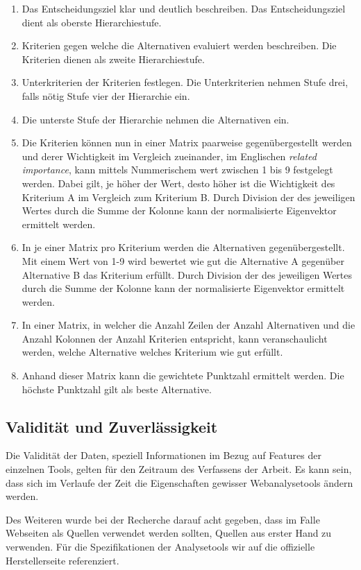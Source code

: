 \begin{enumerate}
  \item Das Entscheidungsziel klar und deutlich beschreiben. Das Entscheidungsziel dient als oberste Hierarchiestufe.
  \item Kriterien gegen welche die Alternativen evaluiert werden beschreiben. Die Kriterien dienen als zweite Hierarchiestufe.
  \item Unterkriterien der Kriterien festlegen. Die Unterkriterien nehmen Stufe drei, falls nötig Stufe vier der Hierarchie ein.
  \item Die unterste Stufe der Hierarchie nehmen die Alternativen ein.
  \item Die Kriterien können nun in einer Matrix paarweise gegenübergestellt werden und derer Wichtigkeit im Vergleich zueinander, im Englischen \textit{related importance}, kann mittels Nummerischem wert zwischen 1 bis 9 festgelegt werden. Dabei gilt, je höher der Wert, desto höher ist die Wichtigkeit des Kriterium A im Vergleich zum Kriterium B. Durch Division der des jeweiligen Wertes durch die Summe der Kolonne kann der normalisierte Eigenvektor ermittelt werden.
  \item In je einer Matrix pro Kriterium werden die Alternativen gegenübergestellt. Mit einem Wert von 1-9 wird bewertet wie gut die Alternative A gegenüber Alternative B das Kriterium erfüllt. Durch Division der des jeweiligen Wertes durch die Summe der Kolonne kann der normalisierte Eigenvektor ermittelt werden.
  \item In einer Matrix, in welcher die Anzahl Zeilen der Anzahl Alternativen und die Anzahl Kolonnen der Anzahl Kriterien entspricht, kann veranschaulicht werden, welche Alternative welches Kriterium wie gut erfüllt.
  \item Anhand dieser Matrix kann die gewichtete Punktzahl ermittelt werden. Die höchste Punktzahl gilt als beste Alternative.
\end{enumerate}

\subsection{Validität und Zuverlässigkeit}
Die Validität der Daten, speziell Informationen im Bezug auf Features der einzelnen Tools, gelten für den Zeitraum des Verfassens der Arbeit. Es kann sein, dass sich im Verlaufe der Zeit die Eigenschaften gewisser Webanalysetools ändern werden. 

Des Weiteren wurde bei der Recherche darauf acht gegeben, dass im Falle Webseiten als Quellen verwendet werden sollten, Quellen aus erster Hand zu verwenden. Für die Spezifikationen der Analysetools wir auf die offizielle Herstellerseite referenziert.

